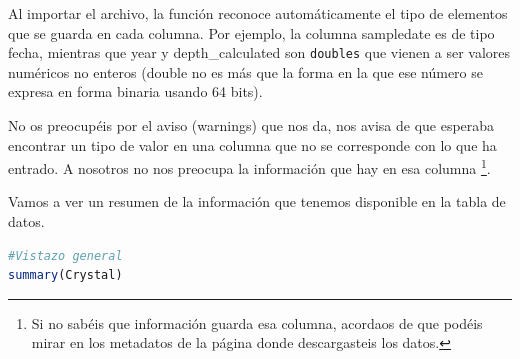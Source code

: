 \documentclass[
]{book}
\newcommand{\passthrough}[1]{#1}
\begin{document}
Al importar el archivo, la función reconoce automáticamente el tipo de elementos que se guarda en cada columna. Por ejemplo, la columna sampledate es de tipo fecha, mientras que year y depth\_calculated son \passthrough{\lstinline!doubles!} que vienen a ser valores numéricos no enteros (double no es más que la forma en la que ese número se expresa en forma binaria usando 64 bits).

No os preocupéis por el aviso (warnings) que nos da, nos avisa de que esperaba encontrar un tipo de valor en una columna que no se corresponde con lo que ha entrado. A nosotros no nos preocupa la información que hay en esa columna \footnote{Si no sabéis que información guarda esa columna, acordaos de que podéis mirar en los metadatos de la página donde descargasteis los datos.}.

Vamos a ver un resumen de la información que tenemos disponible en la tabla de datos.

\begin{lstlisting}[language=R]
#Vistazo general
summary(Crystal)
\end{lstlisting}
\end{document}
